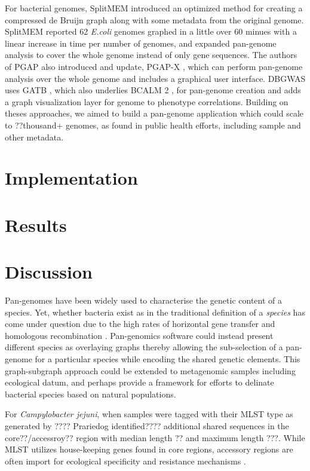\documentclass{article}
\begin{document}
For bacterial genomes, SplitMEM \cite{marcus2014splitmem} introduced an optimized method for creating a compressed de Bruijn graph along with some metadata from the original genome.
SplitMEM reported 62 \textit{E.coli} genomes graphed in a little over 60 minues with a linear increase in time per number of genomes, and expanded pan-genome analysis to cover the whole genome instead of only gene sequences.
The authors of PGAP also introduced and update, PGAP-X \cite{zhao2018pgap}, which can perform pan-genome analysis over the whole genome and includes a graphical user interface.
DBGWAS \cite{jaillard2018fast} uses GATB \cite{drezen2014gatb}, which also underlies BCALM 2 \cite{chikhi2016compacting}, for pan-genome creation and adds a graph visualization layer for genome to phenotype correlations.
Building on theses approaches, we aimed to build a pan-genome application which could scale to ??thousand+ genomes, as found in public health efforts, including sample and other metadata.

\section{Implementation}

\section{Results}

\section{Discussion}

Pan-genomes have been widely used to characterise the genetic content of a species.
Yet, whether bacteria exist as in the traditional definition of a \textit{species} has come under question due to the high rates of horizontal gene transfer and homologous recombination \cite{fraser2009bacterial}.
Pan-genomics software could instead present different species as overlaying graphs thereby allowing the sub-selection of a pan-genome for a particular species while encoding the shared genetic elements.
This graph-subgraph approach could be extended to metagenomic samples including ecological datum, and perhaps provide a framework for efforts \cite{caro2012bacterial} to delinate bacterial species based on natural populations.


For \textit{Campylobacter jejuni}, when samples were tagged with their MLST type as generated by ???? Prariedog identified???? additional shared sequences in the core??/accessroy?? region with median length ?? and maximum length ???. %
While MLST utilizes house-keeping genes found in core regions, accessory regions are often import for ecological specificity and resistance mechanisms \cite{fraser2009bacterial}.
\end{document}
